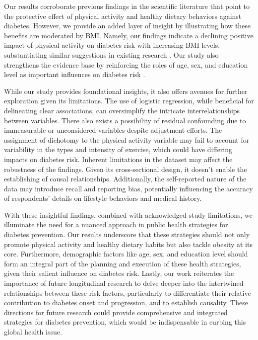 \documentclass[11pt]{article}
\begin{document}
Our results corroborate previous findings in the scientific literature \cite{Li2017TimeTO, Bellou2018RiskFF, Lv2017AdherenceTA} that point to the protective effect of physical activity and healthy dietary behaviors against diabetes. However, we provide an added layer of insight by illustrating how these benefits are moderated by BMI. Namely, our findings indicate a declining positive impact of physical activity on diabetes risk with increasing BMI levels, substantiating similar suggestions in existing research \cite{Hjerkind2017AdiposityPA, Sung2012CombinedIO}. Our study also strengthens the evidence base by reinforcing the roles of age, sex, and education level as important influences on diabetes risk \cite{Zhang2014AdherenceTH, Knowler2002ReductionIT}.

While our study provides foundational insights, it also offers avenues for further exploration given its limitations. The use of logistic regression, while beneficial for delineating clear associations, can oversimplify the intricate interrelationships between variables. There also exists a possibility of residual confounding due to immeasurable or unconsidered variables despite adjustment efforts. The assignment of dichotomy to the physical activity variable may fail to account for variability in the types and intensity of exercise, which could have differing impacts on diabetes risk. Inherent limitations in the dataset may affect the robustness of the findings. Given its cross-sectional design, it doesn't enable the establishing of causal relationships. Additionally, the self-reported nature of the data may introduce recall and reporting bias, potentially influencing the accuracy of respondents' details on lifestyle behaviors and medical history.

With these insightful findings, combined with acknowledged study limitations, we illuminate the need for a nuanced approach in public health strategies for diabetes prevention. Our results underscore that these strategies should not only promote physical activity and healthy dietary habits but also tackle obesity at its core. Furthermore, demographic factors like age, sex, and education level should form an integral part of the planning and execution of these health strategies, given their salient influence on diabetes risk. Lastly, our work reiterates the importance of future longitudinal research to delve deeper into the intertwined relationships between these risk factors, particularly to differentiate their relative contribution to diabetes onset and progression, and to establish causality. These directions for future research could provide comprehensive and integrated strategies for diabetes prevention, which would be indispensable in curbing this global health issue.
\end{document}
